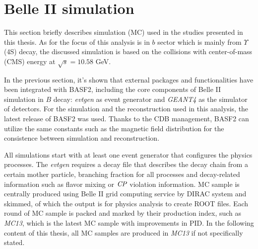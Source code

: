 \begin{comment}
\subsection{Summary}
BASF2 has been developed for an emphasis on providing reliable and high quality performance for Belle II analysis. It satisfies the most of demanding requirements of data taking, simulation, reconstruction, and offline analysis. 
\end{comment}

\section{Belle II simulation}

This section briefly describes simulation (MC) used in the studies presented in this thesis. As for the focus of this analysis is in $b$ sector which is mainly from $\Upsilon$(4S) decay, the discussed simulation is based on the collisions with center-of-mass (CMS) energy at $\sqrt{s} = 10.58 $ GeV.

In the previous section, it's shown that external packages and functionalities have been integrated with BASF2, including the core components of Belle II simulation in $B$ decay: \textit{evtgen} as event generator\cite{evtgen} and \textit{GEANT4} as the simulator of detectors\cite{agostinelli2003geant4}. For the simulation and the reconstruction used in this analysis, the latest release of BASF2 was used. Thanks to the CDB management, BASF2 can utilize the same constants such as the magnetic field distribution for the consistence between simulation and reconstruction.

 All simulations start with at least one event generator that configures the physics processes. The \textit{evtgen} requires a decay file that describes the decay chain from a certain mother particle, branching fraction for all processes and decay-related information such as flavor mixing or $\it{CP}$ violation information. MC sample is centrally produced using Belle II grid computing service by DIRAC system and skimmed, of which the output is for physics analysis to create ROOT files. Each round of MC sample is packed and marked by their production index, such as \textit{MC13}, which is the latest MC sample with improvements in PID. In the following content of this thesis, all MC samples are produced in \textit{MC13} if not specifically stated. 
 
